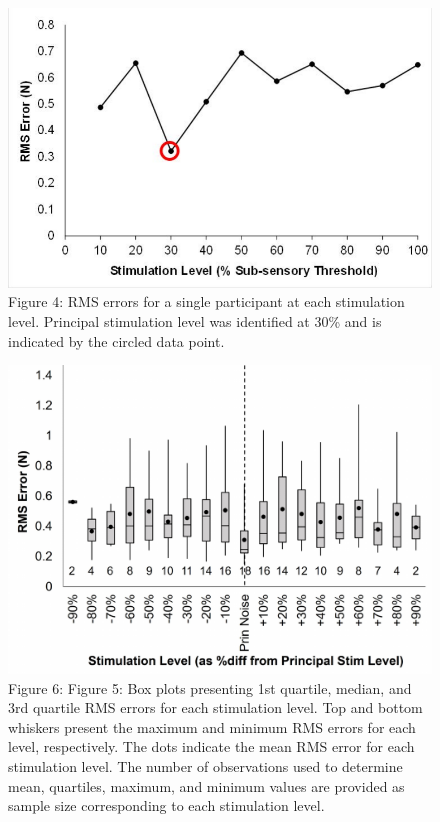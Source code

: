 \documentclass[]{cik}%
\begin{document}
\begin{figure}

{\centering \includegraphics[width=1\textwidth,height=\textheight]{./figures/fig4.pdf}

}

\caption{\label{fig-4}Figure 4: RMS errors for a single participant at
each stimulation level. Principal stimulation level was identified at
30\% and is indicated by the circled data point.}

\end{figure}

\begin{figure}

{\centering \includegraphics[width=1\textwidth,height=\textheight]{./figures/fig5.pdf}

}

\caption{\label{fig-5}Figure 6: Figure 5: Box plots presenting 1st
quartile, median, and 3rd quartile RMS errors for each stimulation
level. Top and bottom whiskers present the maximum and minimum RMS
errors for each level, respectively. The dots indicate the mean RMS
error for each stimulation level. The number of observations used to
determine mean, quartiles, maximum, and minimum values are provided as
sample size corresponding to each stimulation level.}

\end{figure}
\end{document}
